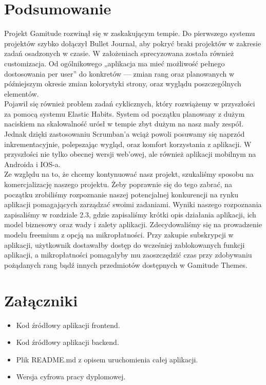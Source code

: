 \documentclass[a4paper,11pt]{report}
\begin{document}
\chapter {Podsumowanie}
Projekt Gamitude rozwinął się w zaskakującym tempie.
Do pierwszego systemu projektów szybko dołączył Bullet Journal, aby pokryć braki projektów w zakresie zadań osadzonych w czasie.
W założeniach sprecyzowana została również customizacja. Od ogólnikowego „aplikacja ma mieć możliwość pełnego dostosowania per user” do konkretów 
— zmian rang oraz planowanych w późniejszym okresie zmian kolorystyki strony, oraz wyglądu poszczególnych elementów.\\
Pojawił się również problem zadań cyklicznych, który rozwiążemy w przyszłości za pomocą systemu Elastic Habits.
System od początku planowany z dużym naciskiem na skalowalność urósł w tempie zbyt dużym na nasz mały zespół.
Jednak dzięki zastosowaniu Scrumban'a wciąż powoli posuwamy się naprzód inkrementacyjnie, polepszając wygląd, oraz komfort korzystania z aplikacji.
W przyszłości nie tylko obecnej wersji web'owej, ale również aplikacji mobilnym na Androida i IOS-a.\\
Ze względu na to, że chcemy kontynuować nasz projekt, szukaliśmy sposobu na komercjalizację naszego projektu.
Żeby poprawnie się do tego zabrać, na początku zrobiliśmy rozpoznanie naszej potencjalnej konkurencji na rynku aplikacji pomagających zarządzać swoimi zadaniami.
Wyniki naszego rozpoznania zapisaliśmy w rozdziale 2.3, gdzie zapisaliśmy krótki opis działania aplikacji, ich model biznesowy oraz wady i zalety aplikacji.
Zdecydowaliśmy się na prowadzenie modelu freemium \cite{freemium} z opcją na mikropłatności. 
Przy zakupie subskrypcji w aplikacji, użytkownik dostawałby dostęp do wcześniej zablokowanych funkcji aplikacji, a mikropłatności pomagałyby mu zaoszczędzić czas przy zdobywaniu pożądanych rang bądź innych przedmiotów dostępnych w Gamitude Themes.

 


\chapter {Załączniki}
\begin{itemize}
	\item Kod źródłowy aplikacji frontend.
	\item Kod źródłowy aplikacji backend.
	\item Plik README.md z opisem uruchomienia całej aplikacji.
	\item Wersja cyfrowa pracy dyplomowej.
\end{itemize}
\end{document}
